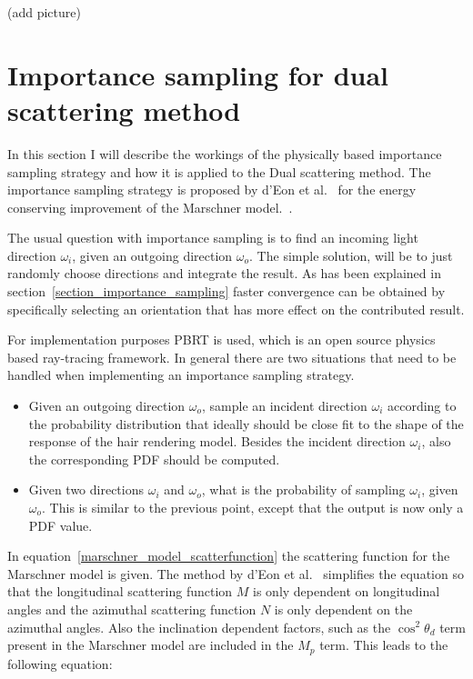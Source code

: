 \documentclass[11pt,a4paper]{report}
\begin{document}
(add picture)

\section{Importance sampling for dual scattering method}

In this section I will describe the workings of the physically based importance sampling strategy and how it is applied to the Dual scattering method. The importance sampling strategy is proposed by d'Eon et al.~\cite{eon2013} for the energy conserving improvement of the Marschner model.~\cite{eon2011}.

The usual question with importance sampling is to find an incoming light direction $\omega_i$, given an outgoing direction $\omega_o$. The simple solution, will be to just randomly choose directions and integrate the result. As has been explained in section~\ref{section_importance_sampling} faster convergence can be obtained by specifically selecting an orientation that has more effect on the contributed result.

For implementation purposes PBRT is used, which is an open source physics based ray-tracing framework. In general there are two situations that need to be handled when implementing an importance sampling strategy.

\begin{itemize}
\item Given an outgoing direction $\omega_o$, sample an incident direction $\omega_i$ according to the probability distribution that ideally should be close fit to the shape of the response of the hair rendering model. Besides the incident direction $\omega_i$, also the corresponding PDF should be computed.
\item Given two directions $\omega_i$ and $\omega_o$, what is the probability of sampling $\omega_i$, given $\omega_o$. This is similar to the previous point, except that the output is now only a PDF value.
\end{itemize}

In equation~\ref{marschner_model_scatterfunction} the scattering function for the Marschner model is given. The method by d'Eon et al.~\cite{eon2011} simplifies the equation so that the longitudinal scattering function $M$ is only dependent on longitudinal angles and the azimuthal scattering function $N$ is only dependent on the azimuthal angles. Also the inclination dependent factors, such as the $\cos^2 \theta_d$ term present in the Marschner model are included in the $M_p$ term. This leads to the following equation:
\end{document}
